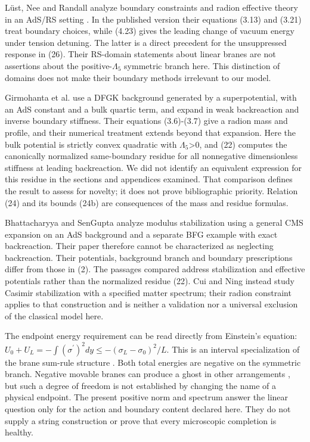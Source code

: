 \documentclass[11pt,a4paper]{article}
\begin{document}
Lüst, Nee and Randall analyze boundary constraints and radion effective theory in an AdS/RS setting \cite{ref9}. In the published version their equations (3.13) and (3.21) treat boundary choices, while (4.23) gives the leading change of vacuum energy under tension detuning. The latter is a direct precedent for the unsuppressed response in (26). Their RS-domain statements about linear branes are not assertions about the positive-\ensuremath{\Lambda}\ensuremath{{}_{5}} symmetric branch here. This distinction of domains does not make their boundary methods irrelevant to our model.

Girmohanta et al. \cite{ref23} use a DFGK background generated by a superpotential, with an AdS constant and a bulk quartic term, and expand in weak backreaction and inverse boundary stiffness. Their equations (3.6)-(3.7) give a radion mass and profile, and their numerical treatment extends beyond that expansion. Here the bulk potential is strictly convex quadratic with \ensuremath{\Lambda}\ensuremath{{}_{5}}>0, and (22) computes the canonically normalized same-boundary residue for all nonnegative dimensionless stiffness at leading backreaction. We did not identify an equivalent expression for this residue in the sections and appendices examined. That comparison defines the result to assess for novelty; it does not prove bibliographic priority. Relation (24) and its bounds (24b) are consequences of the mass and residue formulas.

Bhattacharyya and SenGupta \cite{ref20} analyze modulus stabilization using a general CMS expansion on an AdS background and a separate BFG example with exact backreaction. Their paper therefore cannot be characterized as neglecting backreaction. Their potentials, background branch and boundary prescriptions differ from those in (2). The passages compared address stabilization and effective potentials rather than the normalized residue (22). Cui and Ning \cite{ref15} instead study Casimir stabilization with a specified matter spectrum; their radion constraint applies to that construction and is neither a validation nor a universal exclusion of the classical model here.

The endpoint energy requirement can be read directly from Einstein's equation: \ensuremath{U_0+U_L=-\int(\sigma^{\prime})^2dy\leq-(\sigma_L-\sigma_0)^2/L}. This is an interval specialization of the brane sum-rule structure \cite{ref17}. Both total energies are negative on the symmetric branch. Negative movable branes can produce a ghost in other arrangements \cite{ref19}, but such a degree of freedom is not established by changing the name of a physical endpoint. The present positive norm and spectrum answer the linear question only for the action and boundary content declared here. They do not supply a string construction or prove that every microscopic completion is healthy.
\end{document}

